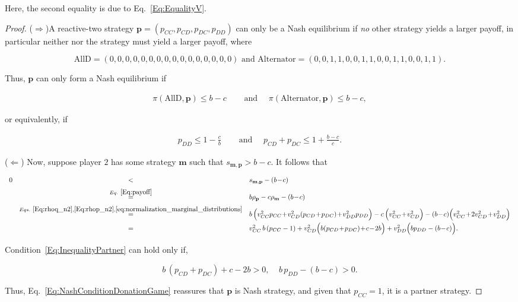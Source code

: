 \documentclass{article}
\theoremstyle{definition}
\begin{document}
Here, the second equality is due to Eq.~\eqref{Eq:EqualityV}.
 
\begin{proof}
($\Rightarrow$)A reactive-two strategy \(\mathbf{p} = (p_{CC}, p_{CD}, p_{DC},
p_{DD})\) can only be a Nash equilibrium if {\it no} other strategy yields a
larger payoff, in particular neither  nor the 
strategy must yield a larger payoff, where

$$
\text{AllD}=(0, 0, 0, 0, 0, 0, 0, 0, 0, 0, 0, 0, 0, 0, 0, 0) \text{ and } \text{Alternator}=(0, 0, 1, 1, 0, 0, 1, 1, 0, 0, 1, 1, 0, 0, 1, 1).
$$

Thus, \(\mathbf{p}\) can only form a Nash equilibrium if 

\begin{align*}
\pi(\text{AllD}, \mathbf{p}) \leq b\!-\!c & \quad \text{ and } \quad \pi(\text{Alternator}, \mathbf{p}) \leq b\!-\!c,
\end{align*}

or equivalently, if

\begin{align}\label{Eq:NashConditionDonationGame}
  p_{DD} \leq 1 - \frac{c}{b} & \quad \text{ and } \quad  p_{CD} + p_{DC} \leq 1 + \frac{b\!-\!c}{c}.
\end{align}

($\Leftarrow$) Now, suppose player $2$ has some strategy $\mathbf{m}$ such that $s_{\mathbf{m},
\mathbf{p}} > b\!-\!c$. It follows that

\begin{equation} \label{Eq:InequalityPartner}
\begin{array}{rcl}
0 	& <	&s_{\mathbf{m}, \mathbf{p}}-(b\!-\!c)\\[0.2cm]
	&\stackrel{Eq.~\eqref{Eq:payoff}}{=}	&b\rho_\mathbf{p} - c\rho_\mathbf{m}-(b\!-\!c)\\[0.2cm]
	&\stackrel{Eqs.~\eqref{Eq:rhoq_n2}, \eqref{Eq:rhop_n2}, \eqref{eq:normalization_marginal_distributions}}{=}	&b\,\Big( v^2_{CC} p_{CC} \!+\!  v^2_{CD}(p_{CD}\!+\!p_{DC}) \!+\! v^2_{DD} p_{DD}\Big) 
		- c\,\Big(v^2_{CC} \!+\! v^2_{CD}\Big) - (b\!-\!c)\Big(v^2_{CC} \!+\!  2v^2_{CD} \!+\! v^2_{DD}\Big)\\[0.2cm]
	&=	&v^2_{CC} \,b\,(p_{CC}-1) + v^2_{CD}\Big(b(p_{CD}\!+\!p_{DC})\!+\!c\!-\!2b\Big) + v^2_{DD}\Big(bp_{DD}-(b\!-\!c)\Big).
\end{array}
\end{equation}

Condition~\eqref{Eq:InequalityPartner} can hold only if,

\begin{equation}
  b \, (p_{CD}\!+\!p_{DC})\!+\!c\!-\!2b > 0,~~~~~ b\, p_{DD} - (b\!-\!c) > 0.
\end{equation}

Thus, Eq.~\eqref{Eq:NashConditionDonationGame} reassures that $\mathbf{p}$
is Nash strategy, and given that $p_{CC} = 1$, it is a partner strategy.
\end{proof}
\end{document}
